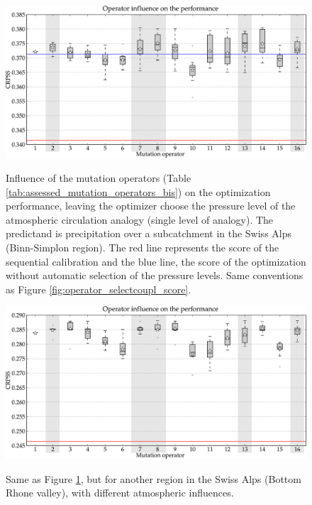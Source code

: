 \documentclass[twocol]{ametsoc}
\begin{document}
\begin{figure}[htb]
	\begin{center}
		\noindent\includegraphics[width=14cm,angle=0]{figures/operator_mutation_score_atmlevel.pdf}\\
	\end{center}
	\caption{Influence of the mutation operators (Table \ref{tab:assessed_mutation_operators_bis}) on the optimization performance, leaving the optimizer choose the pressure level of the atmospheric circulation analogy (single level of analogy). The predictand is precipitation over a subcatchment in the Swiss Alps (Binn-Simplon region). The red line represents the score of the sequential calibration and the blue line, the score of the optimization without automatic selection of the pressure levels. Same conventions as Figure \ref{fig:operator_selectcoupl_score}.}
	\label{fig:operator_mutation_score_atmlevel}
\end{figure}

\begin{figure}[htb]
	\begin{center}
		\noindent\includegraphics[width=14cm,angle=0]{figures/operator_mutation_score_rhoneamont.pdf}\\
	\end{center}
	\caption{Same as Figure \ref{fig:operator_mutation_score_atmlevel}, but for another region in the Swiss Alps (Bottom Rhone valley), with different atmospheric influences.}
	\label{fig:operator_mutation_score_rhoneamont}
\end{figure}
\end{document}

